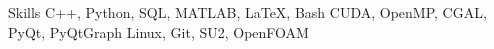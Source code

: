 \begin{rubric}{Skills}
\entry*[Languages]
	C++, Python, SQL, MATLAB, \LaTeX, Bash
\entry*[Libraries]
	CUDA, OpenMP, CGAL, PyQt, PyQtGraph
\entry*[Software]
        Linux, Git, SU2, OpenFOAM
\end{rubric}

